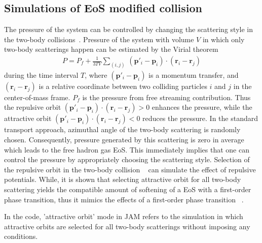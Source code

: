 \documentclass[]{article}
\begin{document}
\subsection{Simulations of EoS modified collision} \label{sec:eoscoll}

The pressure of the system  can be controlled by
changing the scattering style in the two-body collisions~\cite{HSorgePRL1999}.
Pressure of the system with volume $V$
in which only two-body scatterings happen
can be estimated
by the Virial theorem~\cite{PDanielewiczPRC1996}
\begin{eqnarray}
P=P_f+\frac{1}{3TV} \sum_{(i,j)}\,
  (\bm{p}'_i-\bm{p}_i)\cdot (\bm{r}_i-\bm{r}_j)
\end{eqnarray}
during the time interval $T$,
where $(\bm{p}'_i-\bm{p}_i)$ is a momentum transfer,
and $(\bm{r}_i-\bm{r}_j)$ is a relative coordinate
between two colliding particles $i$ and $j$
in the center-of-mass frame.
$P_f$ is the pressure from free streaming contribution.
Thus the repulsive orbit
$(\bm{p}'_i-\bm{p}_i)\cdot (\bm{r}_i-\bm{r}_j) >0$ enhances the pressure,
while the attractive orbit
$(\bm{p}'_i-\bm{p}_i)\cdot (\bm{r}_i-\bm{r}_j) <0$
reduces the pressure.
In the standard transport approach,
azimuthal angle of the two-body scattering is randomly chosen.
Consequently, pressure generated by this scattering
is zero in average which leads to the free hadron gas EoS.
This immediately implies that one can control the pressure
by appropriately choosing the scattering style.
Selection of the repulsive orbit in the two-body collision
~\cite{ECHalbertPRC1981, MGyulassyPLB1982, DEKahanaPRC1997}
can simulate the effect of repulsive potentials.
While, it is shown that selecting attractive orbit for all two-body
scattering yields the compatible amount of softening of a EoS with
a first-order phase transition, thus it
mimics the effects of a first-order phase transition
~\cite{YNaraPRC2016}.

In the code, 'attractive orbit' mode in JAM refers to the simulation
in which attractive orbits are selected for all two-body scatterings
without imposing any conditions.
\end{document}
